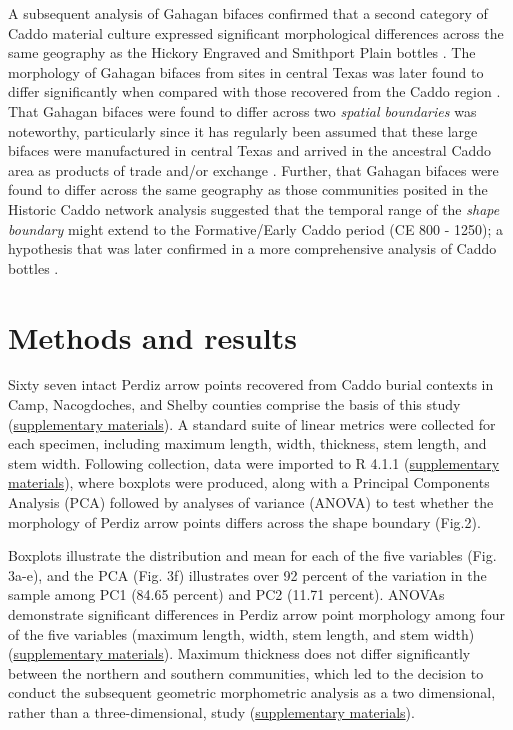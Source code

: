 \documentclass[smallextended]{svjour3}       %
\begin{document}
A subsequent analysis of Gahagan bifaces confirmed that a second
category of Caddo material culture expressed significant morphological
differences across the same geography as the Hickory Engraved and
Smithport Plain bottles \cite{RN8158}. The morphology of Gahagan bifaces
from sites in central Texas was later found to differ significantly when
compared with those recovered from the Caddo region \cite{RN8322}. That
Gahagan bifaces were found to differ across two \emph{spatial
boundaries} was noteworthy, particularly since it has regularly been
assumed that these large bifaces were manufactured in central Texas and
arrived in the ancestral Caddo area as products of trade and/or exchange
\cite{RN8322,RN8158}. Further, that Gahagan bifaces were found to differ
across the same geography as those communities posited in the Historic
Caddo network analysis suggested that the temporal range of the
\emph{shape boundary} might extend to the Formative/Early Caddo period
(CE 800 - 1250); a hypothesis that was later confirmed in a more
comprehensive analysis of Caddo bottles \cite{RN8312}.

\hypertarget{methods-and-results}{%
\section{Methods and results}\label{methods-and-results}}

Sixty seven intact Perdiz arrow points recovered from Caddo burial
contexts in Camp, Nacogdoches, and Shelby counties comprise the basis of
this study (\href{https://seldenlab.github.io/perdiz3/}{supplementary
materials}). A standard suite of linear metrics were collected for each
specimen, including maximum length, width, thickness, stem length, and
stem width. Following collection, data were imported to R 4.1.1
\cite{RN8584} (\href{https://seldenlab.github.io/perdiz3/}{supplementary
materials}), where boxplots were produced, along with a Principal
Components Analysis (PCA) followed by analyses of variance (ANOVA) to
test whether the morphology of Perdiz arrow points differs across the
shape boundary (Fig.2).

Boxplots illustrate the distribution and mean for each of the five
variables (Fig. 3a-e), and the PCA (Fig. 3f) illustrates over 92 percent
of the variation in the sample among PC1 (84.65 percent) and PC2 (11.71
percent). ANOVAs demonstrate significant differences in Perdiz arrow
point morphology among four of the five variables (maximum length,
width, stem length, and stem width)
(\href{https://seldenlab.github.io/perdiz3/}{supplementary materials}).
Maximum thickness does not differ significantly between the northern and
southern communities, which led to the decision to conduct the
subsequent geometric morphometric analysis as a two dimensional, rather
than a three-dimensional, study
(\href{https://seldenlab.github.io/perdiz3/}{supplementary materials}).
\end{document}
